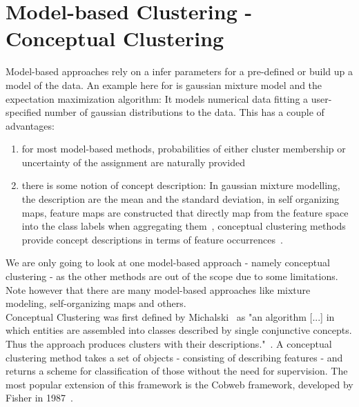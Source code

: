 \section{Model-based Clustering - Conceptual Clustering}
Model-based approaches rely on a infer parameters for a pre-defined or build up a model of the data. An example here for is gaussian mixture model and the expectation maximization algorithm: It models numerical data fitting a user-specified number of gaussian distributions to the data. This has a couple of advantages:
\begin{enumerate}
    \item for most model-based methods, probabilities of either cluster membership or uncertainty of the assignment are naturally provided 
    \item there is some notion of concept description: In gaussian mixture modelling, the description are the mean and the standard deviation, in self organizing maps, feature maps are constructed that directly map from the feature space into the class labels when aggregating them~\cite{yosinski-2015-ICML-DL-understanding-neural-networks}, conceptual clustering methods provide concept descriptions in terms of feature occurrences~\cite{Fisher1987}.
\end{enumerate}
We are only going to look at one model-based approach - namely conceptual clustering - as the other methods are out of the scope due to some limitations. Note however that there are many model-based approaches like mixture modeling, self-organizing maps and others. \\

Conceptual Clustering was first defined by Michalski~\cite{michalski1980knowledge} as "an algorithm [...] in which entities are assembled into classes described by single conjunctive concepts. Thus the approach produces clusters with their descriptions."~\cite{michalski1980knowledge}. A conceptual clustering method takes a set of objects - consisting of describing features - and returns a scheme for classification of those without the need for supervision. The most popular extension of this framework is the Cobweb framework, developed by Fisher in 1987~\cite{Fisher1987}.

